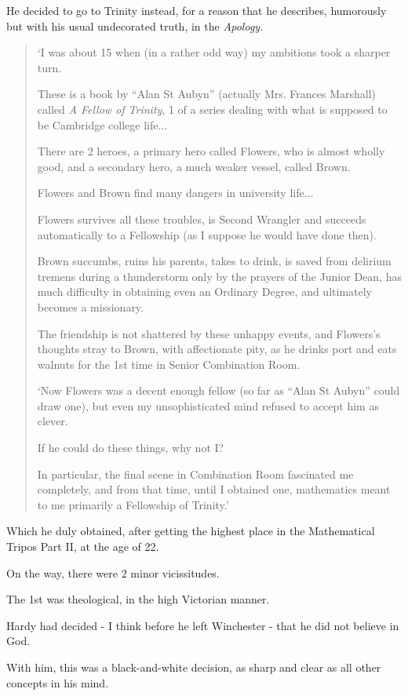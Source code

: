 \documentclass{article}
\numberwithin{equation}{section}
\begin{document}
He decided to go to Trinity instead, for a reason that he describes, humorously but with his usual undecorated truth, in the \textit{Apology}.
\begin{quotation}
    `I was about 15 when (in a rather odd way) my ambitions took a sharper turn.
    
    These is a book by ``Alan St Aubyn'' (actually Mrs. Frances Marshall) called \textit{A Fellow of Trinity}, 1 of a series dealing with what is supposed to be Cambridge college life$\ldots$
    
    There are 2 heroes, a primary hero called Flowers, who is almost wholly good, and a secondary hero, a much weaker vessel, called Brown.
    
    Flowers and Brown find many dangers in university life$\ldots$
    
    Flowers survives all these troubles, is Second Wrangler and succeeds automatically to a Fellowship (as I suppose he would have done then).
    
    Brown succumbs, ruins his parents, takes to drink, is saved from delirium tremens during a thunderstorm only by the prayers of the Junior Dean, has much difficulty in obtaining even an Ordinary Degree, and ultimately becomes a missionary.
    
    The friendship is not shattered by these unhappy events, and Flowers's thoughts stray to Brown, with affectionate pity, as he drinks port and eats walnuts for the 1st time in Senior Combination Room.
    
    `Now Flowers was a decent enough fellow (so far as ``Alan St Aubyn'' could draw one), but even my unsophisticated mind refused to accept him as clever.
    
    If he could do these things, why not I?
    
    In particular, the final scene in Combination Room fascinated me completely, and from that time, until I obtained one, mathematics meant to me primarily a Fellowship of Trinity.'
\end{quotation}
Which he duly obtained, after getting the highest place in the Mathematical Tripos Part II, at the age of 22.

On the way, there were 2 minor vicissitudes.

The 1st was theological, in the high Victorian manner.

Hardy had decided - I think before he left Winchester - that he did not believe in God.

With him, this was a black-and-white decision, as sharp and clear as all other concepts in his mind.
\end{document}
